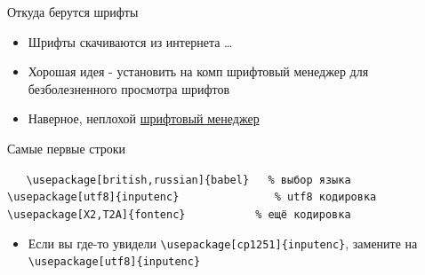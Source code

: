 \documentclass[aspectratio=169]{beamer} %
\begin{document}
{
\begin{frame}{Откуда берутся шрифты}
\Large
\begin{itemize}
\item Шрифты скачиваются из интернета \ldots
\item Хорошая идея - установить на комп шрифтовый менеджер для безболезненного просмотра шрифтов
\item Наверное, неплохой \href{http://fontba.se/}{ шрифтовый менеджер}
\end{itemize}
\end{frame}
}


\begin{frame}[fragile]{Самые первые строки}
\begin{block}{  }
\verb|   \usepackage[british,russian]{babel}   % выбор языка| \newline
\verb|   \usepackage[utf8]{inputenc}               % utf8 кодировка| \newline
\verb|   \usepackage[X2,T2A]{fontenc}           % ещё кодировка|
\end{block}

\begin{itemize}
\item Если вы где-то увидели \verb|\usepackage[cp1251]{inputenc}|,  замените  на  \verb|\usepackage[utf8]{inputenc}|
\end{itemize}

\end{frame}
\end{document}
